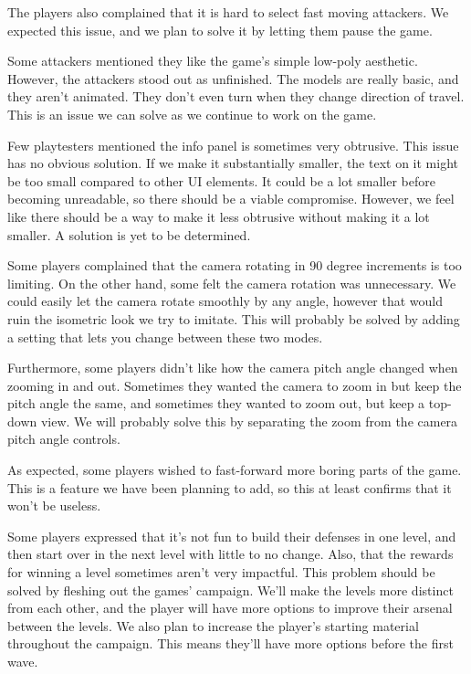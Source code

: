 The players also complained that it is hard to select fast moving attackers.
We expected this issue, and we plan to solve it by letting them pause the game.

Some attackers mentioned they like the game's simple low-poly aesthetic.
However, the attackers stood out as unfinished.
The models are really basic, and they aren't animated.
They don't even turn when they change direction of travel.
This is an issue we can solve as we continue to work on the game.

Few playtesters mentioned the info panel is sometimes very obtrusive.
This issue has no obvious solution.
If we make it substantially smaller, the text on it might be too small compared to other UI elements.
It could be a lot smaller before becoming unreadable, so there should be a viable compromise.
However, we feel like there should be a way to make it less obtrusive without making it a lot smaller.
A solution is yet to be determined.

Some players complained that the camera rotating in 90 degree increments is too limiting.
On the other hand, some felt the camera rotation was unnecessary.
We could easily let the camera rotate smoothly by any angle, however that would ruin the isometric look we try to imitate.
This will probably be solved by adding a setting that lets you change between these two modes.

Furthermore, some players didn't like how the camera pitch angle changed when zooming in and out.
Sometimes they wanted the camera to zoom in but keep the pitch angle the same, and sometimes they wanted to zoom out, but keep a top-down view.
We will probably solve this by separating the zoom from the camera pitch angle controls.

As expected, some players wished to fast-forward more boring parts of the game.
This is a feature we have been planning to add, so this at least confirms that it won't be useless.

Some players expressed that it's not fun to build their defenses in one level, and then start over in the next level with little to no change.
Also, that the rewards for winning a level sometimes aren't very impactful.
This problem should be solved by fleshing out the games' campaign.
We'll make the levels more distinct from each other, and the player will have more options to improve their arsenal between the levels.
We also plan to increase the player's starting material throughout the campaign.
This means they'll have more options before the first wave.

